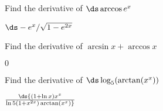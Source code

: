 \begin{exercises}
\begin{exercise} Find the derivative of $\ds \arccos e^x$
\begin{answer} $\ds-e^x/\sqrt{1-e^{2x}}$
\end{answer}\end{exercise}

\begin{exercise} Find the derivative of $\arcsin x + \arccos x$
\begin{answer} $0$
\end{answer}\end{exercise}

\begin{exercise} Find the derivative of $\ds \log _5 (\arctan (x^x ) )$
\begin{answer} $\ds {(1+\ln x)x^x\over\ln5(1+x^{2x})\arctan(x^x)}$
\end{answer}\end{exercise}

\end{exercises}
